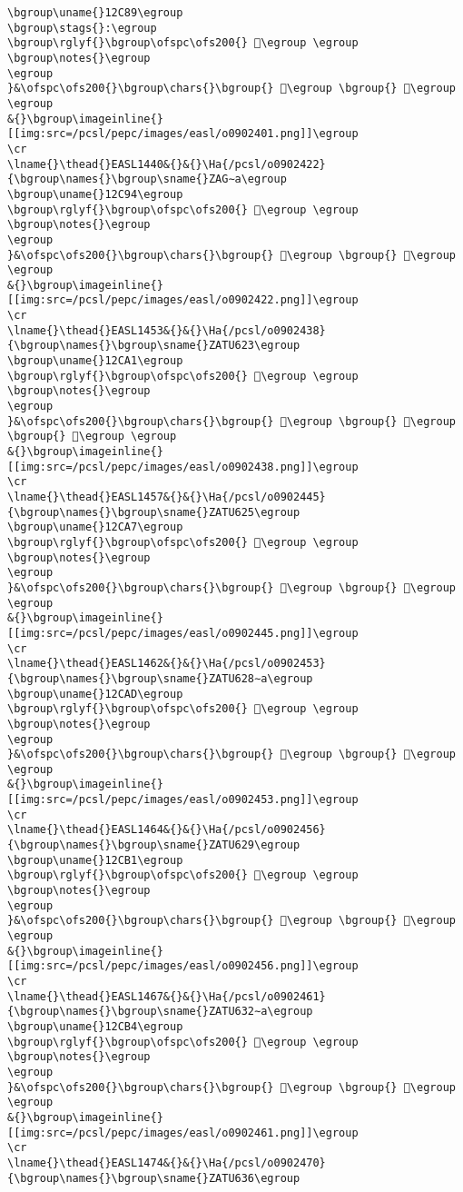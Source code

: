 \begin{verbatim}
\bgroup\uname{}12C89\egroup
\bgroup\stags{}:\egroup
\bgroup\rglyf{}\bgroup\ofspc\ofs200{} 𒲉\egroup \egroup
\bgroup\notes{}\egroup
\egroup
}&\ofspc\ofs200{}\bgroup\chars{}\bgroup{} 𒲈\egroup \bgroup{} 𒲉\egroup \egroup
&{}\bgroup\imageinline{}[[img:src=/pcsl/pepc/images/easl/o0902401.png]]\egroup
\cr
\lname{}\thead{}EASL1440&{}&{}\Ha{/pcsl/o0902422}{\bgroup\names{}\bgroup\sname{}ZAG∼a\egroup
\bgroup\uname{}12C94\egroup
\bgroup\rglyf{}\bgroup\ofspc\ofs200{} 𒲔\egroup \egroup
\bgroup\notes{}\egroup
\egroup
}&\ofspc\ofs200{}\bgroup\chars{}\bgroup{} 𒲓\egroup \bgroup{} 𒲔\egroup \egroup
&{}\bgroup\imageinline{}[[img:src=/pcsl/pepc/images/easl/o0902422.png]]\egroup
\cr
\lname{}\thead{}EASL1453&{}&{}\Ha{/pcsl/o0902438}{\bgroup\names{}\bgroup\sname{}ZATU623\egroup
\bgroup\uname{}12CA1\egroup
\bgroup\rglyf{}\bgroup\ofspc\ofs200{} 𒲡\egroup \egroup
\bgroup\notes{}\egroup
\egroup
}&\ofspc\ofs200{}\bgroup\chars{}\bgroup{} 𒲣\egroup \bgroup{} 𒲢\egroup \bgroup{} 𒲡\egroup \egroup
&{}\bgroup\imageinline{}[[img:src=/pcsl/pepc/images/easl/o0902438.png]]\egroup
\cr
\lname{}\thead{}EASL1457&{}&{}\Ha{/pcsl/o0902445}{\bgroup\names{}\bgroup\sname{}ZATU625\egroup
\bgroup\uname{}12CA7\egroup
\bgroup\rglyf{}\bgroup\ofspc\ofs200{} 𒲧\egroup \egroup
\bgroup\notes{}\egroup
\egroup
}&\ofspc\ofs200{}\bgroup\chars{}\bgroup{} 𒲧\egroup \bgroup{} 𒲨\egroup \egroup
&{}\bgroup\imageinline{}[[img:src=/pcsl/pepc/images/easl/o0902445.png]]\egroup
\cr
\lname{}\thead{}EASL1462&{}&{}\Ha{/pcsl/o0902453}{\bgroup\names{}\bgroup\sname{}ZATU628∼a\egroup
\bgroup\uname{}12CAD\egroup
\bgroup\rglyf{}\bgroup\ofspc\ofs200{} 𒲭\egroup \egroup
\bgroup\notes{}\egroup
\egroup
}&\ofspc\ofs200{}\bgroup\chars{}\bgroup{} 𒲭\egroup \bgroup{} 𒲮\egroup \egroup
&{}\bgroup\imageinline{}[[img:src=/pcsl/pepc/images/easl/o0902453.png]]\egroup
\cr
\lname{}\thead{}EASL1464&{}&{}\Ha{/pcsl/o0902456}{\bgroup\names{}\bgroup\sname{}ZATU629\egroup
\bgroup\uname{}12CB1\egroup
\bgroup\rglyf{}\bgroup\ofspc\ofs200{} 𒲱\egroup \egroup
\bgroup\notes{}\egroup
\egroup
}&\ofspc\ofs200{}\bgroup\chars{}\bgroup{} 𒲰\egroup \bgroup{} 𒲱\egroup \egroup
&{}\bgroup\imageinline{}[[img:src=/pcsl/pepc/images/easl/o0902456.png]]\egroup
\cr
\lname{}\thead{}EASL1467&{}&{}\Ha{/pcsl/o0902461}{\bgroup\names{}\bgroup\sname{}ZATU632∼a\egroup
\bgroup\uname{}12CB4\egroup
\bgroup\rglyf{}\bgroup\ofspc\ofs200{} 𒲴\egroup \egroup
\bgroup\notes{}\egroup
\egroup
}&\ofspc\ofs200{}\bgroup\chars{}\bgroup{} 𒲴\egroup \bgroup{} 𒲵\egroup \egroup
&{}\bgroup\imageinline{}[[img:src=/pcsl/pepc/images/easl/o0902461.png]]\egroup
\cr
\lname{}\thead{}EASL1474&{}&{}\Ha{/pcsl/o0902470}{\bgroup\names{}\bgroup\sname{}ZATU636\egroup

\end{verbatim}
